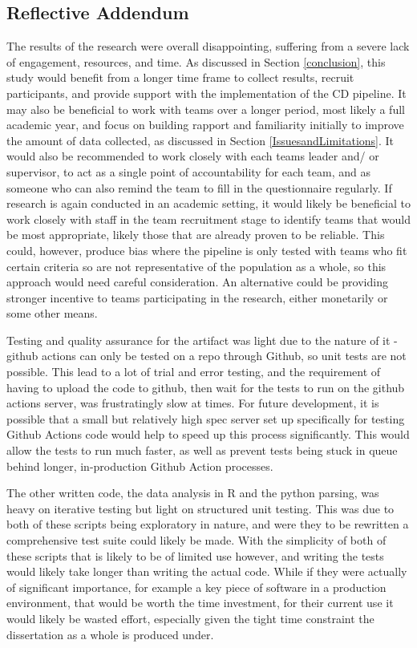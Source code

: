 \documentclass[journal]{IEEEtran}
\begin{document}
\subsection*{Reflective Addendum}
    The results of the research were overall disappointing, suffering from a severe lack of engagement, resources, and time. As discussed in Section \ref{conclusion}, this study would benefit from a longer time frame to collect results, recruit participants, and provide support with the implementation of the CD pipeline. It may also be beneficial to work with teams over a longer period, most likely a full academic year, and focus on building rapport and familiarity initially to improve the amount of data collected, as discussed in Section \ref{IssuesandLimitations}. It would also be recommended to work closely with each teams leader and/ or supervisor, to act as a single point of accountability for each team, and as someone who can also remind the team to fill in the questionnaire regularly. If research is again conducted in an academic setting, it would likely be beneficial to work closely with staff in the team recruitment stage to identify teams that would be most appropriate, likely those that are already proven to be reliable. This could, however, produce bias where the pipeline is only tested with teams who fit certain criteria so are not representative of the population as a whole, so this approach would need careful consideration. An alternative could be providing stronger incentive to teams participating in the research, either monetarily or some other means.

    Testing and quality assurance for the artifact was light due to the nature of it - github actions can only be tested on a repo through Github, so unit tests are not possible. This lead to a lot of trial and error testing, and the requirement of having to upload the code to github, then wait for the tests to run on the github actions server, was frustratingly slow at times. For future development, it is possible that a small but relatively high spec server set up specifically for testing Github Actions code would help to speed up this process significantly. This would allow the tests to run much faster, as well as prevent tests being stuck in queue behind longer, in-production Github Action processes.
    
    The other written code, the data analysis in R and the python parsing, was heavy on iterative testing but light on structured unit testing. This was due to both of these scripts being exploratory in nature, and were they to be rewritten a comprehensive test suite could likely be made. With the simplicity of both of these scripts that is likely to be of limited use however, and writing the tests would likely take longer than writing the actual code. While if they were actually of significant importance, for example a key piece of software in a production environment, that would be worth the time investment, for their current use it would likely be wasted effort, especially given the tight time constraint the dissertation as a whole is produced under.
\end{document}
